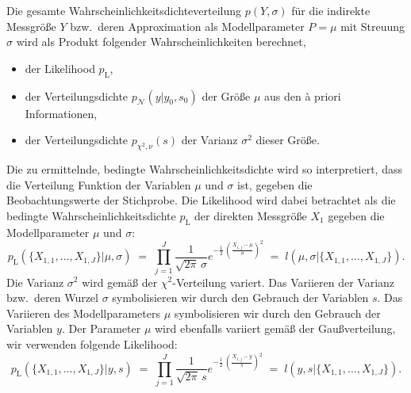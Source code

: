Die gesamte Wahrscheinlichkeitsdichteverteilung $p(Y,\sigma)$ für die indirekte Messgröße
$Y$ bzw.\ deren Approximation als Modellparameter $P = \mu$ mit Streuung $\sigma$ wird als Produkt
folgender Wahrscheinlichkeiten berechnet,
\begin{itemize}
\item der Likelihood $p_\mathrm{L}$, 
\item der Verteilungsdichte $p_\mathcal{N}(y | y_0, s_0)$ der Größe $\mu$ aus den {\`a} priori Informationen,
\item der Verteilungsdichte $p_{\chi^2,\nu}(s)$ der Varianz $\sigma^2$ dieser Größe.
\end{itemize}
Die zu ermittelnde, bedingte Wahrscheinlichkeitsdichte wird so interpretiert, dass die Verteilung Funktion
der Variablen $\mu$ und $\sigma$ ist, gegeben die Beobachtungswerte der Stichprobe. Die Likelihood wird
dabei betrachtet als die bedingte Wahrscheinlichkeitsdichte $p_\mathrm{L}$ der
direkten Messgröße $X_1$ gegeben die Modellparameter $\mu$ und $\sigma$:
\begin{equation}
p_\mathrm{L}(\{X_{1,1}, \dots, X_{1,J}\} | \mu, \sigma) \; = \;
\prod\limits_{j=1}^J \frac{1}{\sqrt{2 \pi} \, \sigma}
 e^{- \frac{1}{2} \, \left( \frac{X_{1,j} - \mu}{\sigma} \right)^2 }  \; = \;
l(\mu, \sigma | \{X_{1,1}, \dots, X_{1,J}\}).
\end{equation}
Die Varianz $\sigma^2$ wird gemäß der $\chi^2$-Verteilung variert. Das Variieren der Varianz
bzw.\ deren Wurzel $\sigma$ symbolisieren wir durch den Gebrauch der Variablen $s$.
Das Variieren des Modellparameters $\mu$ symbolisieren wir durch den Gebrauch der Variablen $y$.
Der Parameter $\mu$ wird ebenfalls variiert gemäß der Gaußverteilung, wir verwenden folgende
Likelihood:
\begin{equation}
p_\mathrm{L}(\{X_{1,1}, \dots, X_{1,J}\} | y, s) \; = \;
\prod\limits_{j=1}^J \frac{1}{\sqrt{2 \pi} \, s}
 e^{- \frac{1}{2} \, \left( \frac{X_{1,j} - y}{s} \right)^2 }  \; = \;
l(y, s | \{X_{1,1}, \dots, X_{1,J}\}).
\end{equation}

